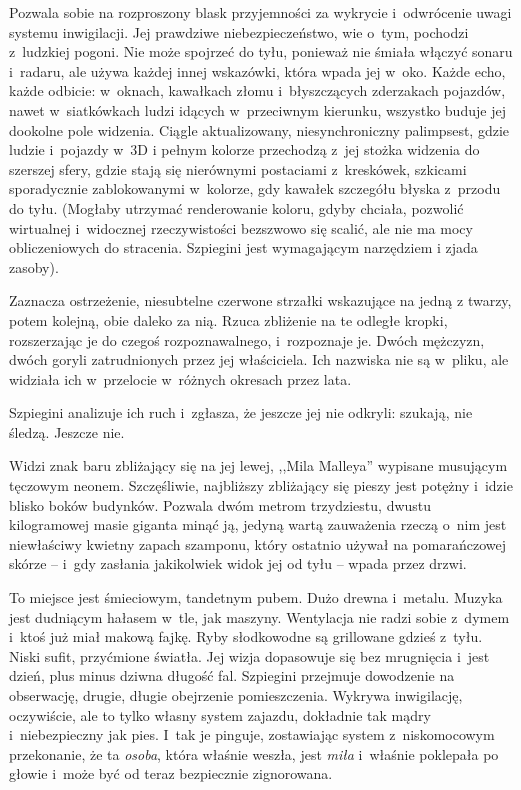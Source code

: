 \documentclass[oneside,polish,11pt,sfheadings]{mwbk}
\begin{document}
Pozwala sobie na rozproszony blask przyjemności za wykrycie i~odwrócenie
uwagi systemu inwigilacji. Jej prawdziwe niebezpieczeństwo, wie o~tym,
pochodzi z~ludzkiej pogoni. Nie może spojrzeć do tyłu, ponieważ nie
śmiała włączyć sonaru i~radaru, ale używa każdej innej wskazówki, która
wpada jej w~oko. Każde echo, każde odbicie: w~oknach, kawałkach złomu i~błyszczących zderzakach pojazdów, nawet w~siatkówkach ludzi idących w~przeciwnym kierunku, wszystko buduje jej dookolne pole widzenia. Ciągle
aktualizowany, niesynchroniczny palimpsest, gdzie ludzie i~pojazdy w~3D
i pełnym kolorze przechodzą z~jej stożka widzenia do szerszej sfery,
gdzie stają się nierównymi postaciami z~kreskówek, szkicami sporadycznie
zablokowanymi w~kolorze, gdy kawałek szczegółu błyska z~przodu do tyłu.
(Mogłaby utrzymać renderowanie koloru, gdyby chciała, pozwolić
wirtualnej i~widocznej rzeczywistości bezszwowo się scalić, ale nie ma
mocy obliczeniowych do stracenia. Szpiegini jest wymagającym narzędziem
i zjada zasoby).

Zaznacza ostrzeżenie, niesubtelne czerwone strzałki wskazujące na jedną
z twarzy, potem kolejną, obie daleko za nią. Rzuca zbliżenie na te
odległe kropki, rozszerzając je do czegoś rozpoznawalnego, i~rozpoznaje
je. Dwóch mężczyzn, dwóch goryli zatrudnionych przez jej właściciela.
Ich nazwiska nie są w~pliku, ale widziała ich w~przelocie w~różnych
okresach przez lata.

Szpiegini analizuje ich ruch i~zgłasza, że jeszcze jej nie odkryli:
szukają, nie śledzą. Jeszcze nie.

Widzi znak baru zbliżający się na jej lewej, ,,Mila Malleya'' wypisane
musującym tęczowym neonem. Szczęśliwie, najbliższy zbliżający się pieszy
jest potężny i~idzie blisko boków budynków. Pozwala dwóm metrom
trzydziestu, dwustu kilogramowej masie giganta minąć ją, jedyną wartą
zauważenia rzeczą o~nim jest niewłaściwy kwietny zapach szamponu, który
ostatnio używał na pomarańczowej skórze -- i~gdy zasłania jakikolwiek
widok jej od tyłu -- wpada przez drzwi.

To miejsce jest śmieciowym, tandetnym pubem. Dużo drewna i~metalu.
Muzyka jest dudniącym hałasem w~tle, jak maszyny. Wentylacja nie radzi
sobie z~dymem i~ktoś już miał makową fajkę. Ryby słodkowodne są
grillowane gdzieś z~tyłu. Niski sufit, przyćmione światła. Jej wizja
dopasowuje się bez mrugnięcia i~jest dzień, plus minus dziwna długość
fal. Szpiegini przejmuje dowodzenie na obserwację, drugie, długie
obejrzenie pomieszczenia. Wykrywa inwigilację, oczywiście, ale to tylko
własny system zajazdu, dokładnie tak mądry i~niebezpieczny jak pies. I~tak je pinguje, zostawiając system z~niskomocowym przekonanie, że ta
\emph{osoba}, która właśnie weszła, jest \emph{miła} i~właśnie poklepała
po głowie i~może być od teraz bezpiecznie zignorowana.
\end{document}
